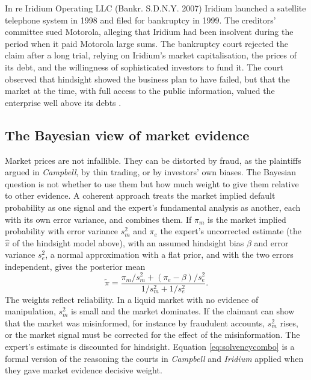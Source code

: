\begin{casebox}{In re Iridium Operating LLC (Bankr. S.D.N.Y. 2007)}
Iridium launched a satellite telephone system in 1998 and filed for bankruptcy in 1999. The creditors' committee sued Motorola, alleging that Iridium had been insolvent during the period when it paid Motorola large sums. The bankruptcy court rejected the claim after a long trial, relying on Iridium's market capitalisation, the prices of its debt, and the willingness of sophisticated investors to fund it. The court observed that hindsight showed the business plan to have failed, but that the market at the time, with full access to the public information, valued the enterprise well above its debts \citep{iridium2007}.
\end{casebox}

\subsection{The Bayesian view of market evidence}

Market prices are not infallible. They can be distorted by fraud, as the plaintiffs argued in \emph{Campbell}, by thin trading, or by investors' own biases. The Bayesian question is not whether to use them but how much weight to give them relative to other evidence. A coherent approach treats the market implied default probability as one signal and the expert's fundamental analysis as another, each with its own error variance, and combines them. If $\pi_m$ is the market implied probability with error variance $s_m^2$ and $\pi_e$ the expert's uncorrected estimate (the $\hat\pi$ of the hindsight model above), with an assumed hindsight bias $\beta$ and error variance $s_e^2$, a normal approximation with a flat prior, and with the two errors independent, gives the posterior mean
\begin{equation}
\tilde\pi = \frac{\pi_m/s_m^2 + (\pi_e - \beta)/s_e^2}{1/s_m^2 + 1/s_e^2}.
\label{eq:solvencycombo}
\end{equation}
The weights reflect reliability. In a liquid market with no evidence of manipulation, $s_m^2$ is small and the market dominates. If the claimant can show that the market was misinformed, for instance by fraudulent accounts, $s_m^2$ rises, or the market signal must be corrected for the effect of the misinformation. The expert's estimate is discounted for hindsight. Equation \eqref{eq:solvencycombo} is a formal version of the reasoning the courts in \emph{Campbell} and \emph{Iridium} applied when they gave market evidence decisive weight.

